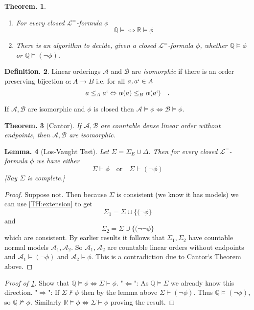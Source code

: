 \documentclass[a4paper,oneside,11pt,DIV=12,parskip=half]{scrartcl}
\newcommand{\R}{\mathbb R}
\newcommand{\LL}{\mathcal L}
\newcommand{\A}{\mathcal A}
\theoremstyle{plain}
\newtheorem{theorem}{Theorem.}[section]
\newtheorem{lemma}[theorem]{Lemma.}
\theoremstyle{definition}
\newtheorem{definition}[theorem]{Definition.}
\newtheorem{remark, definition}[theorem]{Remark and Definition.}
\newtheorem{lemma, definition}[theorem]{Lemma and Definition.}
\newtheorem{theorem, definition}[theorem]{Theorem and Definition.}
\theoremstyle{remark}
\newtheorem*{remark, example}{\textbf{Remark and Exercise}}
\begin{document}
\begin{theorem}\label{Th:QsimR}
\begin{enumerate}
    \item For every closed $\LL^=$-formula $\phi$
        \[ \mathbb{Q} \vDash \Leftrightarrow \R \vDash \phi \]
    \item There is an algorithm to decide, given a closed $\LL^=$-formula $\phi$, whether $\mathbb{Q} \vDash \phi$ or $\mathbb{Q} \vDash (\lnot \phi)$.
\end{enumerate}
\end{theorem}

\begin{definition}
     Linear orderings $\A$ and $\mathcal{B}$ are \emph{isomorphic} if there is an order preserving bijection $\alpha: A \rightarrow B$ i.e. for all $a,a` \in A$
     \[ a \leq_A a` \Leftrightarrow \alpha(a) \leq_B \alpha(a`) \quad . \]
     
     If $\A, \mathcal{B}$ are isomorphic and $\phi$ is closed then $\A \vDash \phi \Leftrightarrow \mathcal{B} \vDash \phi$.
\end{definition}

\begin{theorem}[Cantor]
If $\A,\mathcal{B}$ are countable dense linear order without endpoints, then $\A,\mathcal{B}$ are isomorphic.
\end{theorem}

\begin{lemma}[Los-Vaught Test]
Let $\Sigma = \Sigma_E \cup \Delta$. Then for every closed $\LL^=$-formula $\phi$ we have either
    \[ \Sigma \vdash \phi \quad \text{or} \quad \Sigma \vdash (\lnot \phi) \]
[Say $\Sigma$ is complete.]
\end{lemma}

\begin{proof}
Suppose not. Then because $\Sigma$ is consistent (we know it has models) we can use \ref{TH:extension} to get 
\[ \Sigma_1 = \Sigma \cup \{ (\lnot \phi \} \] and
\[ \Sigma_2 = \Sigma \cup \{ (\lnot \lnot \phi \} \]
which are consistent.
By earlier results it follows that $\Sigma_1, \Sigma_2$ have countable normal models $\A_1,\A_2$. So $\A_1,\A_2$ are countable linear orders without endpoints and $\A_1 \vDash (\lnot \phi)$ and $\A_2 \vDash \phi$. This is a contradiction due to Cantor`s Theorem above.
\end{proof}

\begin{proof}[Proof of \ref{Th:QsimR}]
Show that $\mathbb{Q} \vDash \phi \Leftrightarrow \Sigma \vdash \phi$.
"$\Leftarrow$": As $\mathbb{Q} \vDash \Sigma$ we already know this direction.
"$\Rightarrow$": If $\Sigma \not \vdash \phi$ then by the lemma above $\Sigma \vdash (\lnot \phi)$. Thus $\mathbb{Q} \vDash (\lnot \phi)$, so $\mathbb{Q} \not \vDash \phi $.
Similarly $\R \vDash \phi \Leftrightarrow \Sigma \vdash \phi$ proving the result. 
\end{proof}
\end{document}
